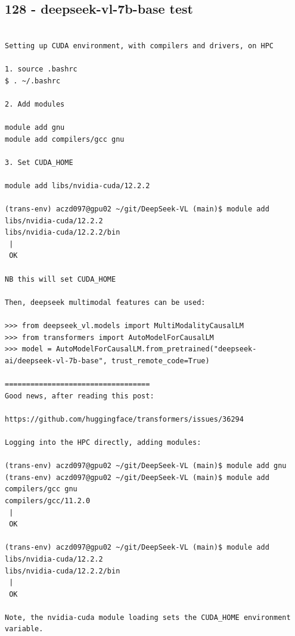 

\subsection{128 - deepseek-vl-7b-base test}
\label{app_res:128}

\begin{verbatim}
    
Setting up CUDA environment, with compilers and drivers, on HPC

1. source .bashrc
$ . ~/.bashrc

2. Add modules

module add gnu
module add compilers/gcc gnu

3. Set CUDA_HOME

module add libs/nvidia-cuda/12.2.2

(trans-env) aczd097@gpu02 ~/git/DeepSeek-VL (main)$ module add libs/nvidia-cuda/12.2.2
libs/nvidia-cuda/12.2.2/bin
 |
 OK

NB this will set CUDA_HOME

Then, deepseek multimodal features can be used:

>>> from deepseek_vl.models import MultiModalityCausalLM
>>> from transformers import AutoModelForCausalLM
>>> model = AutoModelForCausalLM.from_pretrained("deepseek-ai/deepseek-vl-7b-base", trust_remote_code=True)

==================================
Good news, after reading this post:

https://github.com/huggingface/transformers/issues/36294

Logging into the HPC directly, adding modules:

(trans-env) aczd097@gpu02 ~/git/DeepSeek-VL (main)$ module add gnu
(trans-env) aczd097@gpu02 ~/git/DeepSeek-VL (main)$ module add compilers/gcc gnu
compilers/gcc/11.2.0
 |
 OK

(trans-env) aczd097@gpu02 ~/git/DeepSeek-VL (main)$ module add libs/nvidia-cuda/12.2.2
libs/nvidia-cuda/12.2.2/bin
 |
 OK

Note, the nvidia-cuda module loading sets the CUDA_HOME environment variable.


\end{verbatim}
